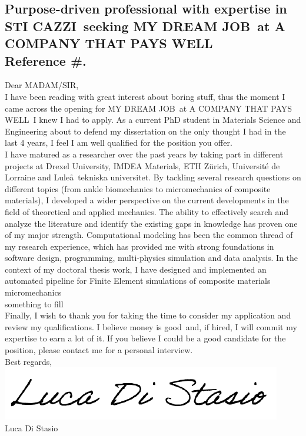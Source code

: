 \documentclass[
  a4paper, 
]{fortysecondscv}
\def\expertise{STI CAZZI}
\def\position{MY DREAM JOB}
\def\company{A COMPANY THAT PAYS WELL}
\def\reference{\\[6pt] Reference \#}
\def\salutation{MADAM/SIR}
\def\readinginterest{boring stuff}
\def\dissertationtopic{the only thought I had in the last 4 years}
\def\finalbelief{money is good}
\def\finalcommitment{earn a lot of it}
\begin{document}
\makefrontsidebar

\cvsignature
\vspace*{12pt}
\subsection{\textbf{Purpose-driven professional with expertise in \expertise\ seeking \position\ at \company\reference.}}
\vspace*{12pt}
Dear \salutation,\\[6pt]
I have been reading with great interest about \readinginterest, thus the moment I came across the opening for \position\ at \company\ I knew I had to apply. As a current PhD student in Materials Science and Engineering about to defend my dissertation on \dissertationtopic, I feel I am well qualified for the position you offer.\\[6pt]
I have matured as a researcher over the past years by taking part in different projects at Drexel University, IMDEA Materials, ETH Z\"urich, Universit\'e de Lorraine and Lule\aa\ tekniska universitet. By tackling several research questions on different topics (from ankle biomechanics to micromechanics of composite materials), I developed a wider perspective on the current developments in the field of theoretical and applied mechanics. The ability to effectively search and analyze the literature and identify the existing gaps in knowledge has proven one of my major strength. Computational modeling has been the common thread of my research experience, which has provided me with strong foundations in software design, programming, multi-physics simulation and data analysis. In the context of my doctoral thesis work, I have designed and implemented an automated pipeline for Finite Element simulations of composite materials micromechanics\\[6pt]
\lipsum[3]something to fill\\[6pt]
Finally, I wish to thank you for taking the time to consider my application and review my qualifications. I believe \finalbelief\ and, if hired, I will commit my expertise to \finalcommitment. If you believe I could be a good candidate for the position, please contact me for a personal interview.\\[12pt]
Best regards,\\
\includegraphics[scale=0.75]{Signature.png}\\
Luca Di Stasio
\end{document}
